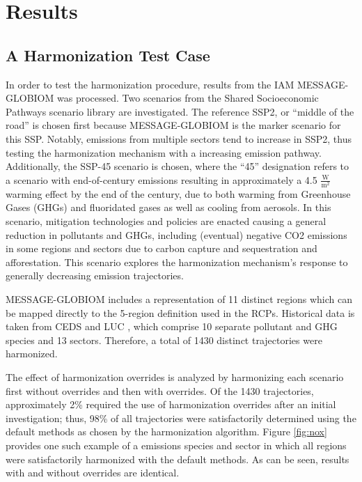 \section{Results}\label{sec:results}

\subsection{A Harmonization Test Case}

In order to test the  harmonization procedure, results from the IAM
MESSAGE-GLOBIOM  was processed. Two scenarios from the Shared Socioeconomic
Pathways scenario library  are investigated. The reference SSP2, or
``middle of the road'' is chosen first because MESSAGE-GLOBIOM is the marker
scenario for this SSP. Notably, emissions from multiple sectors tend to increase
in SSP2, thus testing the harmonization mechanism with a increasing emission
pathway. Additionally, the SSP-45 scenario is chosen, where the ``45''
designation refers to a scenario with end-of-century emissions resulting in
approximately a 4.5 $\frac{\text{W}}{\text{m}^2}$ warming effect by the end of
the century, due to both warming from Greenhouse Gases (GHGs) and fluoridated
gases as well as cooling from aerosols. In this scenario, mitigation
technologies and policies are enacted causing a general reduction in pollutants
and GHGs, including (eventual) negative CO2 emissions in some regions and
sectors due to carbon capture and sequestration and afforestation. This scenario
explores the harmonization mechanism's response to generally decreasing emission
trajectories.

MESSAGE-GLOBIOM includes a representation of 11 distinct regions which can be
mapped directly to the 5-region definition used in the RCPs. Historical data is
taken from CEDS and LUC , which comprise 10 separate
pollutant and GHG species and 13 sectors. Therefore, a total of 1430 distinct
trajectories were harmonized.

The effect of harmonization overrides is analyzed by harmonizing each scenario
first without overrides and then with overrides. Of the 1430 trajectories,
approximately 2\% required the use of harmonization overrides after an initial
investigation; thus, 98\% of all trajectories were satisfactorily determined
using the default methods as chosen by the harmonization algorithm. Figure
\ref{fig:nox} provides one such example of a emissions species and sector in
which all regions were satisfactorily harmonized with the default methods. As
can be seen, results with and without overrides are identical.

